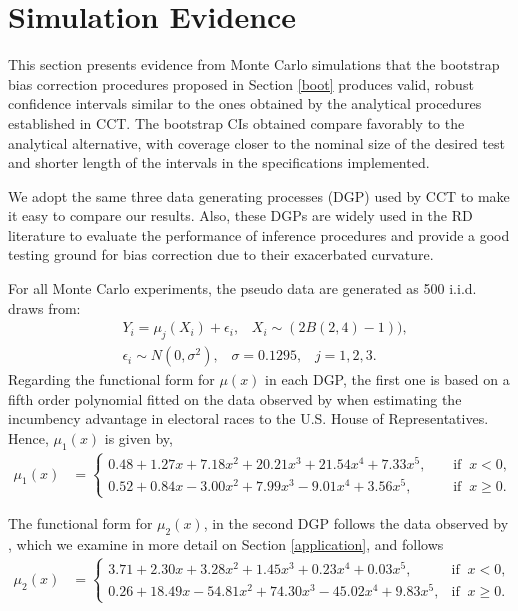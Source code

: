 \documentclass[12pt,fleqn]{article}
\begin{document}
\section{Simulation Evidence}\label{sim}

This section presents evidence from Monte Carlo simulations that the bootstrap bias correction procedures proposed in Section \ref{boot} produces valid, robust confidence intervals similar to the ones obtained by the analytical procedures established in CCT. The bootstrap CIs obtained compare favorably to the analytical alternative, with coverage closer to the nominal size of the desired test and shorter length of the intervals in the specifications implemented.

We adopt the same three data generating processes (DGP) used by CCT to make it easy to compare our results. Also, these DGPs are widely used in the RD literature to evaluate the performance of inference procedures and provide a good testing ground for bias correction due to their exacerbated curvature.

For all Monte Carlo experiments, the pseudo data are generated as 500 i.i.d. draws from:
\begin{align*}
& Y_{i} = \mu_{j}(X_{i}) + \epsilon_{i}, \;\;\; X_{i} \sim  (2 B (2,4) - 1)), \\
& \epsilon_{i} \sim N(0, \sigma^{2}), \;\;\; \sigma = 0.1295, \;\;\; j = 1,2,3.
\end{align*}
Regarding the functional form for $\mu(x)$ in each DGP, the first one is based on a fifth order polynomial fitted on the data observed by \cite{lee2008rand} when estimating the incumbency advantage in electoral races to the U.S. House of Representatives. Hence, $\mu_{1}(x)$ is given by,
\begin{align}
\mu_{1}(x) & = 
\begin{cases}
0.48 + 1.27x + 7.18x^{2} + 20.21x^{3} + 21.54x^{4} + 7.33x^{5}, \;\;\;\; & \text{if} \;\; x < 0, \\
0.52 + 0.84x - 3.00x^{2} + 7.99x^3 - 9.01x^4 + 3.56x^{5},  & \text{if} \;\; x \ge 0.
\end{cases}
\end{align}

The functional form for $\mu_{2}(x)$, in the second DGP follows the data observed by \cite{ludwig2007}, which we examine in more detail on Section \ref{application}, and follows
\begin{align}
\mu_{2}(x) & = 
\begin{cases}
3.71 + 2.30x + 3.28x^2 + 1.45x^3 + 0.23x^4 + 0.03x^5, \;\; & \text{if} \;\; x < 0, \\
0.26 + 18.49x - 54.81x^2 + 74.30x^3 - 45.02x^4 + 9.83x^5,  & \text{if} \;\; x \ge 0.
\end{cases}
\end{align}
\end{document}
